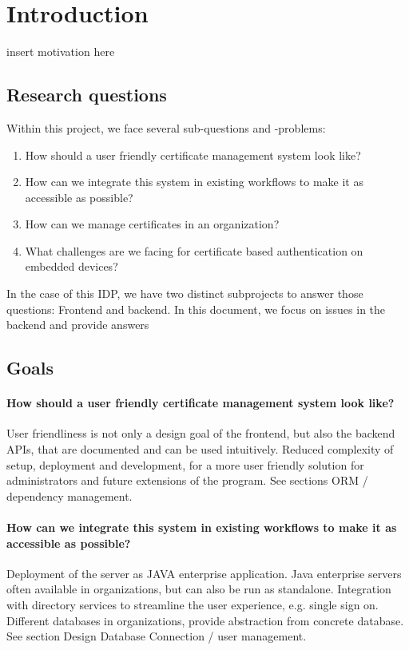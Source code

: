 \chapter{Introduction}\label{ch:introduction}
insert motivation here
\section{Research questions}\label{sec:researchQuestions}

Within this project, we face several sub-questions and -problems:
\begin{enumerate}
    \item How should a user friendly certificate management system look like?
    \item How can we integrate this system in existing workflows to make it as accessible as possible?
    \item How can we manage certificates in an organization?
    \item What challenges are we facing for certificate based authentication on embedded devices?
\end{enumerate}

In the case of this IDP, we have two distinct subprojects to answer those questions: Frontend and backend.
In this document, we focus on issues in the backend and provide answers

\section{Goals}\label{sec:goals}

\subsubsection*{How should a user friendly certificate management system look like?}
User friendliness is not only a design goal of the frontend, but also the backend APIs, that are documented and can be
used intuitively.
Reduced complexity of setup, deployment and development, for a more user friendly solution for administrators and future
extensions of the program.
See sections ORM / dependency management.

\subsubsection*{How can we integrate this system in existing workflows to make it as accessible as possible?}
Deployment of the server as JAVA enterprise application.
Java enterprise servers often available in organizations, but can also be run as standalone.
Integration with directory services to streamline the user experience, e.g. single sign on.
Different databases in organizations, provide abstraction from concrete database.
See section Design Database Connection / user management.

